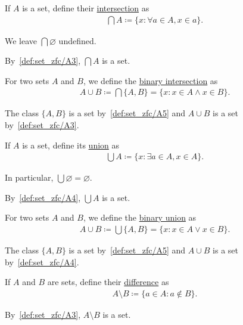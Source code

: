\begin{definition}\label{def:set_intersection}\cite[4]{Lectures:general_topology}
  If $A$ is a set, define their \uline{intersection} as
  \begin{align*}
    \bigcap A \coloneqq \{ x \colon \forall a \in A, x \in a \}.
  \end{align*}

  We leave $\bigcap \varnothing$ undefined.

  By~\ref{def:set_zfc/A3}, $\bigcap A$ is a set.

  For two sets $A$ and $B$, we define the \uline{binary intersection} as
  \begin{align*}
    A \cup B \coloneqq \bigcap \{ A, B \} = \{ x \colon x \in A \land x \in B \}.
  \end{align*}

  The class $\{ A, B \}$ is a set by~\ref{def:set_zfc/A5} and $A \cup B$ is a set by~\ref{def:set_zfc/A3}.
\end{definition}

\begin{definition}\label{def:set_union}\cite[4]{Lectures:general_topology}
  If $A$ is a set, define its \uline{union} as
  \begin{align*}
    \bigcup A \coloneqq \{ x \colon \exists a \in A, x \in A \}.
  \end{align*}

  In particular, $\bigcup \varnothing = \varnothing$.

  By~\ref{def:set_zfc/A4}, $\bigcup A$ is a set.

  For two sets $A$ and $B$, we define the \uline{binary union} as
  \begin{align*}
    A \cup B \coloneqq \bigcup \{ A, B \} = \{ x \colon x \in A \lor x \in B \}.
  \end{align*}

  The class $\{ A, B \}$ is a set by~\ref{def:set_zfc/A5} and $A \cup B$ is a set by~\ref{def:set_zfc/A4}.
\end{definition}

\begin{definition}\label{def:set_difference}\cite[4]{Lectures:general_topology}
  If $A$ and $B$ are sets, define their \uline{difference} as
  \begin{align*}
    A \setminus B \coloneqq \{ a \in A \colon a \not\in B \}.
  \end{align*}

  By~\ref{def:set_zfc/A3}, $A \setminus B$ is a set.
\end{definition}

